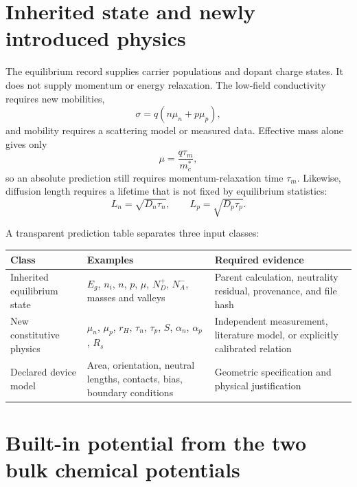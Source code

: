 \section{Inherited state and newly introduced physics}

The equilibrium record supplies carrier populations and dopant charge states.
It does not supply momentum or energy relaxation.  The low-field conductivity
requires new mobilities,
\begin{equation}
 \sigma=q(n\mu_n+p\mu_p),
 \label{eq:integrated-conductivity}
\end{equation}
and mobility requires a scattering model or measured data.  Effective mass
alone gives only
\begin{equation}
 \mu=\frac{q\tau_m}{m_c^*},
 \label{eq:integrated-mobility}
\end{equation}
so an absolute prediction still requires momentum-relaxation time $\tau_m$.
Likewise, diffusion length requires a lifetime that is not fixed by equilibrium
statistics:
\begin{equation}
 L_n=\sqrt{D_n\tau_n},
 \qquad
 L_p=\sqrt{D_p\tau_p}.
 \label{eq:integrated-diffusion-length}
\end{equation}

A transparent prediction table separates three input classes:
\begin{center}
\small
\begin{tabularx}{\textwidth}{@{}>{\raggedright\arraybackslash}p{}>{\raggedright\arraybackslash}p{}>{\raggedright\arraybackslash}X@{}}
\toprule
Class & Examples & Required evidence \\
\midrule
Inherited equilibrium state & $E_g$, $n_i$, $n$, $p$, $\mu$, $N_D^+$, $N_A^-$, masses and valleys & Parent calculation, neutrality residual, provenance, and file hash \\
New constitutive physics & $\mu_n$, $\mu_p$, $r_H$, $\tau_n$, $\tau_p$, $S$, $\alpha_n$, $\alpha_p$, $R_s$ & Independent measurement, literature model, or explicitly calibrated relation \\
Declared device model & Area, orientation, neutral lengths, contacts, bias, boundary conditions & Geometric specification and physical justification \\
\bottomrule
\end{tabularx}
\end{center}

\section{Built-in potential from the two bulk chemical potentials}

